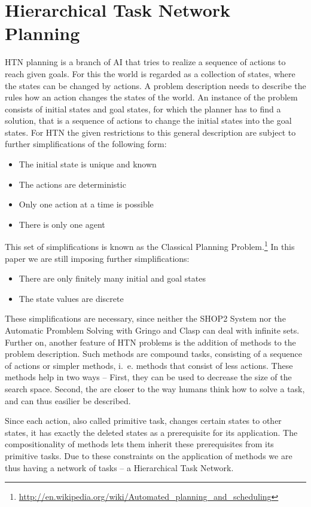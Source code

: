 \documentclass[10pt,a4paper]{article}
\begin{document}
\section{Hierarchical Task Network Planning}\label{HTNplan}
HTN planning is a branch of AI that tries to realize a sequence of actions to reach given goals. For this the world is regarded as a collection of states, where the states can be changed by actions. A problem description needs to describe the rules how an action changes the states of the world. An instance of the problem consists of initial states and goal states, for which the planner has to find a solution, that is a sequence of actions to change the initial states into the goal states. For HTN the given restrictions to this general description are subject to further simplifications of the following form:
\begin{itemize}
\item The initial state is unique and known
\item The actions are deterministic
\item Only one action at a time is possible
\item There is only one agent
\end{itemize}
This set of simplifications is known as the Classical Planning Problem.\footnote{\url{http://en.wikipedia.org/wiki/Automated_planning_and_scheduling}}
In this paper we are still imposing further simplifications:
\begin{itemize}
\item There are only finitely many initial and goal states
\item The state values are discrete
\end{itemize}
These simplifications are necessary, since neither the SHOP2 System nor the Automatic Promblem Solving with Gringo and Clasp can deal with infinite sets. Further on, another feature of HTN problems is the addition of methods to the problem description. Such methods are compound tasks, consisting of a sequence of actions or simpler methods, i.~e. methods that consist of less actions. These methods help in two ways -- First, they can be used to decrease the size of the search space. Second, the are closer to the way humans think how to solve a task, and can thus easilier be described.

Since each action, also called primitive task, changes certain states to other states, it has exactly the deleted states as a prerequisite for its application. The compositionality of methods lets them inherit these prerequisites from its primitive tasks. Due to these constraints on the application of methods we are thus having a network of tasks -- a Hierarchical Task Network.
\end{document}

